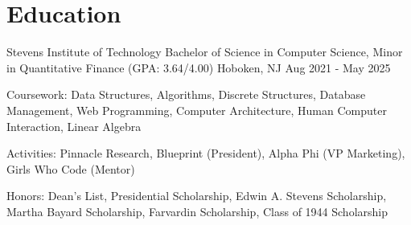 
\section{Education}

\resumeSubHeadingListStart
\resumeExp
{Stevens Institute of Technology} 
{Bachelor of Science in Computer Science, Minor in Quantitative Finance (GPA: 3.64/4.00)}
{Hoboken, NJ}
{Aug 2021 - May 2025}
\resumeItemListStart
\item[\tiny$\bullet$] Coursework: Data Structures, Algorithms, Discrete Structures, Database Management, Web Programming, Computer Architecture, Human Computer Interaction, Linear Algebra
\item[\tiny$\bullet$] Activities: Pinnacle Research, Blueprint (President), Alpha Phi (VP Marketing), Girls Who Code (Mentor)
\item[\tiny$\bullet$] Honors: Dean's List, Presidential Scholarship, Edwin A. Stevens Scholarship, Martha Bayard Scholarship, Farvardin Scholarship, Class of 1944 Scholarship
\resumeItemListEnd

\resumeSubHeadingListEnd
\vspace{-7mm}
